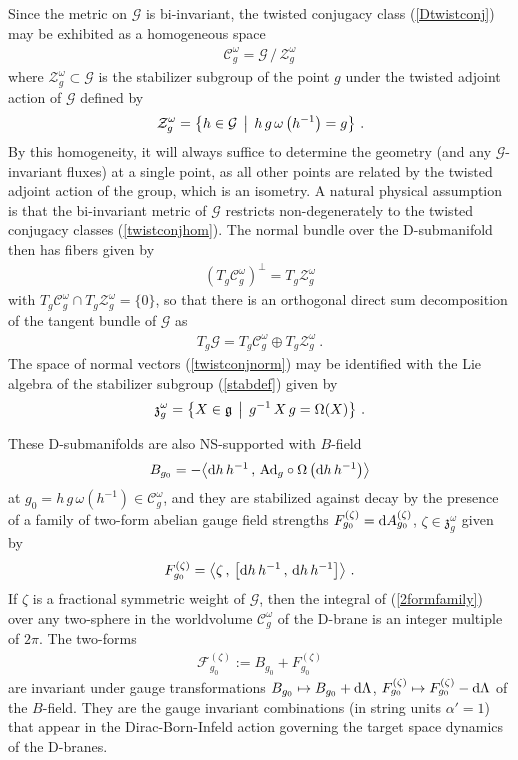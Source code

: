 \documentclass[11pt,a4paper]{article}
\def\dd{{\rm d}}
\newcommand{\beq}{\begin{eqnarray}}
\newcommand{\eeq}{\end{eqnarray}}
\begin{document}
Since the metric on $\mathcal{G}$ is bi-invariant, the twisted conjugacy class
(\ref{Dtwistconj}) may be exhibited as a homogeneous space
\beq
{\mathcal C}_g^\omega=\mathcal{G}\,/\,{\mathcal Z}_g^\omega
\label{twistconjhom}\eeq
where ${\mathcal Z}_g^\omega\subset \mathcal{G}$ is the stabilizer
subgroup of the point $g$ under the twisted adjoint action of
$\mathcal{G}$ defined by
\beq
{\mathcal Z}_g^\omega=\bigl\{h\in \mathcal{G}\,\bigm|\,h\,g\,\omega\left(h^{-1}
\right)=g\bigr\} \ .
\label{stabdef}\eeq
By this homogeneity, it will always suffice to determine the geometry
(and any $\mathcal{G}$-invariant fluxes) at a single point, as all other points
are related by the twisted adjoint action of the group, which is an
isometry. A natural physical assumption is that the bi-invariant
metric of $\mathcal{G}$ restricts non-degenerately to the twisted conjugacy
classes (\ref{twistconjhom}). The normal bundle over the D-submanifold
then has fibers given by
\beq
\left(T_g\mathcal{C}_g^\omega\right)^\perp=T_g\mathcal{Z}_g^\omega
\label{twistconjnorm}\eeq
with $T_g\mathcal{C}_g^\omega\cap T_g\mathcal{Z}_g^\omega=\{0\}$, so
that there is an orthogonal direct sum decomposition of the tangent
bundle of $\mathcal{G}$ as
\beq
T_g\mathcal{G}=T_g\mathcal{C}_g^\omega\oplus T_g\mathcal{Z}_g^\omega \ .
\label{TgGdecomp}\eeq
The space of normal vectors (\ref{twistconjnorm}) may be identified
with the Lie algebra of the stabilizer subgroup (\ref{stabdef}) given
by
\beq
\mathfrak{z}_g^\omega=\bigl\{X\in\mathfrak{g}\,\bigm|\,g^{-1}\,X\,g=
\Omega(X)\bigr\} \ .
\label{stabLiealg}\eeq

These D-submanifolds are also NS-supported with
$B$-field~\cite{Stanciu1}
\beq
B_{g_0}=-\bigl\langle\dd h\,h^{-1}\,,\,{\rm Ad}_g\circ\Omega\left(
\dd h\,h^{-1}\right)\bigr\rangle
\label{Bfieldg0}\eeq
at $g_0=h\,g\,\omega(h^{-1})\in{\mathcal C}_g^\omega$, and they are
stabilized against decay by the presence of a family of two-form
abelian gauge field strengths $F_{g_0}^{(\zeta)}=\dd
A_{g_0}^{(\zeta)}$, $\zeta\in\mathfrak{z}_g^\omega$ given
by~\cite{BSR1}
\beq
F_{g_0}^{(\zeta)}=\bigl\langle\zeta\,,\,
\left[\dd h\,h^{-1}\,,\,\dd h\,h^{-1}\right]\bigr\rangle \ .
\label{2formfamily}\eeq
If $\zeta$ is a fractional symmetric weight of $\mathcal{G}$, then the
integral of (\ref{2formfamily}) over any two-sphere in the worldvolume
$\mathcal{C}_g^\omega$ of the D-brane is an integer multiple of
$2\pi$. The two-forms
\beq
\mathcal{F}_{g_0}^{(\zeta)}:=B^{~}_{g_0}+F_{g_0}^{(\zeta)}
\label{inv2forms}\eeq
are invariant under gauge transformations $B_{g_0}\mapsto B_{g_0}+\dd\Lambda$,
$F_{g_0}^{(\zeta)}\mapsto F_{g_0}^{(\zeta)}-\dd\Lambda$ of the
$B$-field. They are the gauge invariant combinations (in string units
$\alpha'=1$) that appear in the Dirac-Born-Infeld action governing the
target space dynamics of the D-branes.
\end{document}
